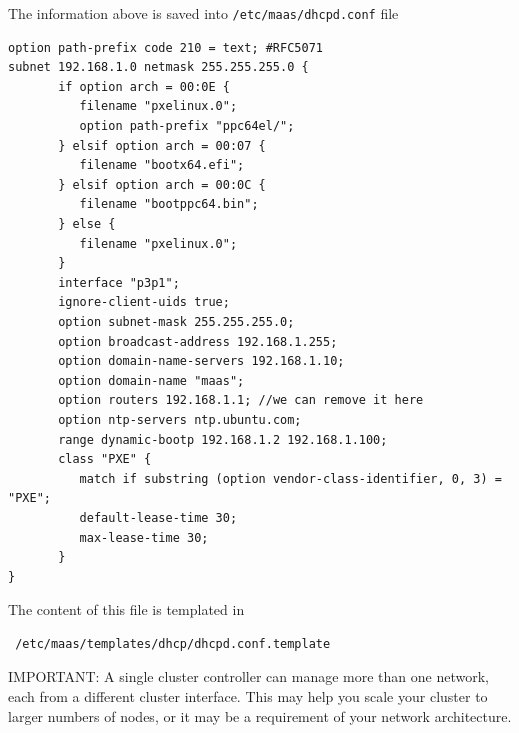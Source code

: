 The information above is saved into \verb!/etc/maas/dhcpd.conf! file
\begin{verbatim}
option path-prefix code 210 = text; #RFC5071
subnet 192.168.1.0 netmask 255.255.255.0 {
       if option arch = 00:0E {
          filename "pxelinux.0";
          option path-prefix "ppc64el/";
       } elsif option arch = 00:07 {
          filename "bootx64.efi";
       } elsif option arch = 00:0C {
          filename "bootppc64.bin";
       } else {
          filename "pxelinux.0";
       }
       interface "p3p1";
       ignore-client-uids true;
       option subnet-mask 255.255.255.0;
       option broadcast-address 192.168.1.255;
       option domain-name-servers 192.168.1.10;
       option domain-name "maas";
       option routers 192.168.1.1; //we can remove it here
       option ntp-servers ntp.ubuntu.com;
       range dynamic-bootp 192.168.1.2 192.168.1.100;
       class "PXE" {
          match if substring (option vendor-class-identifier, 0, 3) = "PXE";
          default-lease-time 30;
          max-lease-time 30;
       }
}

\end{verbatim}
The content of this file is templated in 
\begin{verbatim}
 /etc/maas/templates/dhcp/dhcpd.conf.template
\end{verbatim}

IMPORTANT: A single cluster controller can manage more than one network, each
from a different cluster interface. This may help you scale your cluster to larger
numbers of nodes, or it may be a requirement of your network architecture. 

